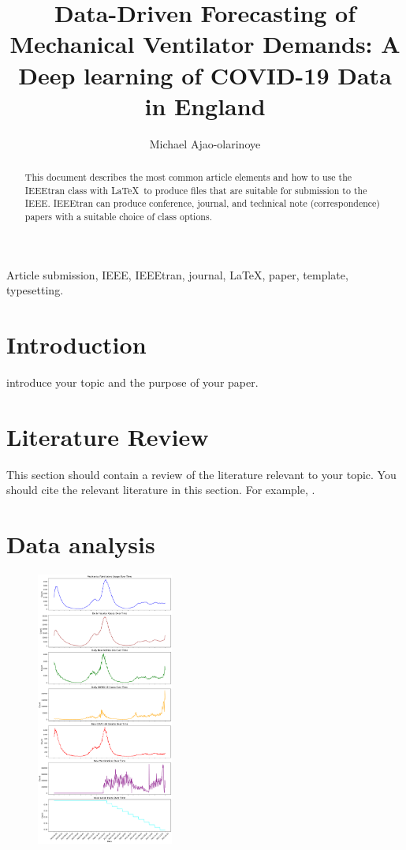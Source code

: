 \documentclass[lettersize, journal]{IEEEtran}
\begin{document}
\title{Data-Driven Forecasting of Mechanical Ventilator Demands: A Deep learning of COVID-19 Data in England}
\author{Michael Ajao-olarinoye}

\maketitle
\thispagestyle{empty}


\begin{abstract}
    This document describes the most common article elements and how to use the IEEEtran class with \LaTeX \ to produce files that are suitable for submission to the IEEE.  IEEEtran can produce conference, journal, and technical note (correspondence) papers with a suitable choice of class options.
\end{abstract}

\begin{IEEEkeywords}
    Article submission, IEEE, IEEEtran, journal, \LaTeX, paper, template, typesetting.
\end{IEEEkeywords}

\section{Introduction}
 introduce your topic and the purpose of your paper.



\section{Literature Review}
\label{sec:lit_review}
This section should contain a review of the literature relevant to your topic. You should cite the relevant literature in this section. For example, \cite{ajao2020}.

\section[short]{Data analysis}
\begin{figure}[h]
    \includegraphics[width=0.4\textwidth]{"../Research paper/images/trend_analysis_improved.pdf"}
\end{figure}
\end{document}
